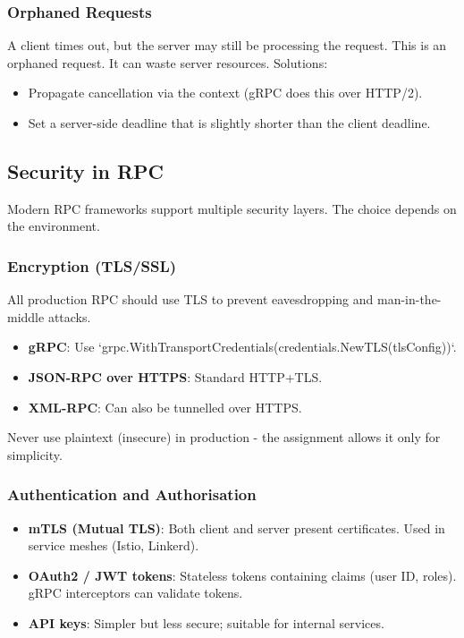 \documentclass[a4paper]{article}
\begin{document}
\subsubsection{Orphaned Requests}
A client times out, but the server may still be processing the request. This is an orphaned request. It can waste server resources. Solutions:
\begin{itemize}
    \item Propagate cancellation via the context (gRPC does this over HTTP/2).
    \item Set a server-side deadline that is slightly shorter than the client deadline.
\end{itemize}

\subsection{Security in RPC}
Modern RPC frameworks support multiple security layers. The choice depends on the environment.

\subsubsection{Encryption (TLS/SSL)}
All production RPC should use TLS to prevent eavesdropping and man-in-the-middle attacks.
\begin{itemize}
    \item \textbf{gRPC}: Use `grpc.WithTransportCredentials(credentials.NewTLS(tlsConfig))`.
    \item \textbf{JSON-RPC over HTTPS}: Standard HTTP+TLS.
    \item \textbf{XML-RPC}: Can also be tunnelled over HTTPS.
\end{itemize}
Never use plaintext (insecure) in production - the assignment allows it only for simplicity.

\subsubsection{Authentication and Authorisation}
\begin{itemize}
    \item \textbf{mTLS (Mutual TLS)}: Both client and server present certificates. Used in service meshes (Istio, Linkerd).
    \item \textbf{OAuth2 / JWT tokens}: Stateless tokens containing claims (user ID, roles). gRPC interceptors can validate tokens.
    \item \textbf{API keys}: Simpler but less secure; suitable for internal services.
\end{itemize}
\end{document}
